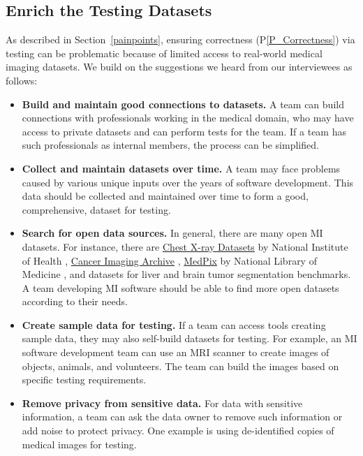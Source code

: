 \documentclass[final, 3p, times, authoryear]{elsarticle}
\newcommand{\ppref}[1]{P\ref{#1}}
\begin{document}
\subsection{Enrich the Testing Datasets} 
\label{sec_recommendations_testing_dataset}

As described in Section~\ref{painpoints}, ensuring correctness
(\ppref{P_Correctness}) via testing can be problematic because of limited access
to real-world medical imaging datasets.  We build on the suggestions we heard
from our interviewees as follows:

\begin{itemize}
\item \textbf{Build and maintain good connections to datasets.} A team can build
connections with professionals working in the medical domain, who may have
access to private datasets and can perform tests for the team. If a team has
such professionals as internal members, the process can be simplified.

\item \textbf{Collect and maintain datasets over time.} A team may face problems
caused by various unique inputs over the years of software development. This
data should be collected and maintained over time to form a good, comprehensive,
dataset for testing.

\item \textbf{Search for open data sources.} In general, there are many open MI
datasets.  For instance, there are
\href{https://nihcc.app.box.com/v/ChestXray-NIHCC}{Chest X-ray Datasets} by
National Institute of Health \citep{WangEtAl2017},
\href{https://www.cancerimagingarchive.net/}{Cancer Imaging Archive}
\citep{PriorEtAl2017}, \href{https://medpix.nlm.nih.gov/home}{MedPix} by
National Library of Medicine \citep{Smirniotopoulos2014}, and datasets for liver
\citep{BilicEtAl2019} and brain \citep{MenzeEtAl2015} tumor segmentation
benchmarks.  A team developing MI software should be able to find more open
datasets according to their needs.

\item \textbf{Create sample data for testing.} If a team can access tools
creating sample data, they may also self-build datasets for testing. For
example, an MI software development team can use an MRI scanner to create images
of objects, animals, and volunteers. The team can build the images based on
specific testing requirements.

\item \textbf{Remove privacy from sensitive data.} For data with sensitive
information, a team can ask the data owner to remove such information or add
noise to protect privacy. One example is using de-identified copies of medical
images for testing.


\end{itemize}
\end{document}
